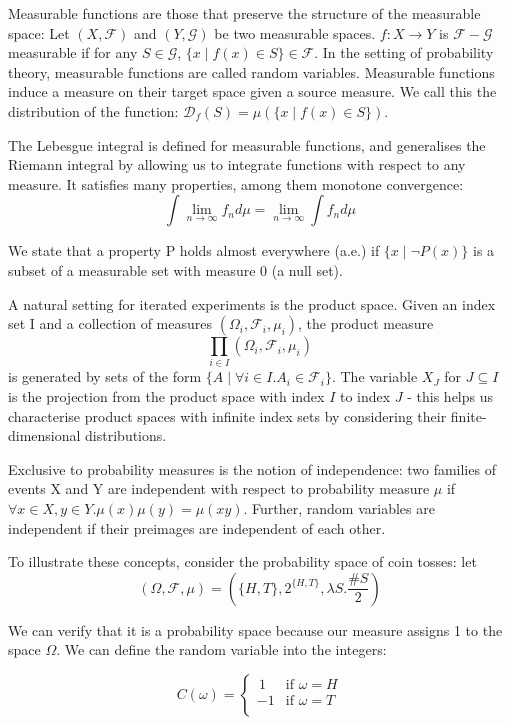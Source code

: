 \documentclass[orivec, envcountsame]{llncs}
\begin{document}
Measurable functions are those that preserve the structure of the measurable space: Let \((X, \mathcal{F})\) and \((Y, \mathcal{G})\) be two measurable spaces. \(f : X \to Y\) is \(\mathcal{F} - \mathcal{G}\) measurable if for any \(S \in \mathcal{G}\), \(\{x \mid f(x) \in S\} \in \mathcal{F}\). In the setting of probability theory, measurable functions are called random variables. Measurable functions induce a measure on their target space given a source measure. We call this the distribution of the function: \(\mathcal{D}_f(S) = \mu(\{x \mid f(x) \in S\})\).

The Lebesgue integral is defined for measurable functions, and generalises the Riemann integral by allowing us to integrate functions with respect to any measure. It satisfies many properties, among them monotone convergence: \[\int \lim_{n \to \infty} f_n d\mu = \lim_{n\to\infty}\int f_n d\mu\]

We state that a property P holds almost everywhere (a.e.) if \(\{x \mid \lnot P(x)\}\) is a subset of a measurable set with measure 0 (a null set).

A natural setting for iterated experiments is the product space. Given an index set I and a collection of measures \((\Omega_i, \mathcal{F}_i, \mu_i)\), the product measure \[\prod_{i\in I} (\Omega_i, \mathcal{F}_i, \mu_i)\] is generated by sets of the form \(\{A \mid \forall i \in I. A_i \in \mathcal{F}_i\}\). The variable \(X_J\) for \(J \subseteq I\) is the projection from the product space with index \(I\) to index \(J\) - this helps us characterise product spaces with infinite index sets by considering their finite-dimensional distributions.

Exclusive to probability measures is the notion of independence: two families of events X and Y are independent with respect to probability measure \(\mu\) if \(\forall x \in X, y \in Y. \mu(x)\mu(y) = \mu(xy)\). Further, random variables are independent if their preimages are independent of each other.

To illustrate these concepts, consider the probability space of coin tosses: let \[(\Omega, \mathcal{F}, \mu) = \left(\{H,T\}, 2^{\{H, T\}}, \lambda S.\frac{\#S}{2}\right)\]

We can verify that it is a probability space because our measure assigns 1 to the space \(\Omega\). We can define the random variable into the integers:
\begin{definition}\label{def:coin_toss}
 \[C(\omega) = \begin{cases}
    \,1 & \text {if } \omega = H \\
    -1  & \text{if } \omega = T\\
\end{cases}\]
\end{definition}
\end{document}
